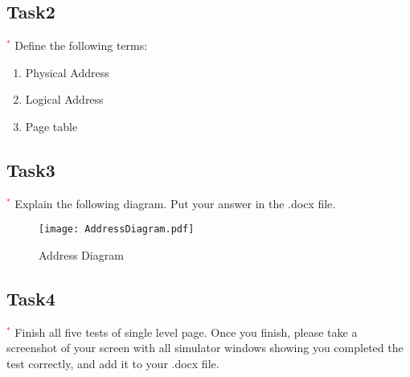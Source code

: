 \documentclass[16pt]{article}
\begin{document}
\subsection*{Task2}

\textcolor{red}{$^{*}$} Define the following terms:

\begin{enumerate}

\item Physical Address
\item Logical Address
\item Page table

\end{enumerate}


\subsection*{Task3}

\textcolor{red}{$^{*}$} Explain the following diagram. Put your answer in the .docx file.

\begin{figure}[h!]
\centering
\texttt{[image: AddressDiagram.pdf]}
\caption{Address Diagram}
\end{figure}

\subsection*{Task4}

\textcolor{red}{$^{*}$} Finish all five tests of single level page. Once you finish, please take a screenshot of your screen with all simulator windows showing you completed the test correctly, and add it to your .docx file.
\end{document}
